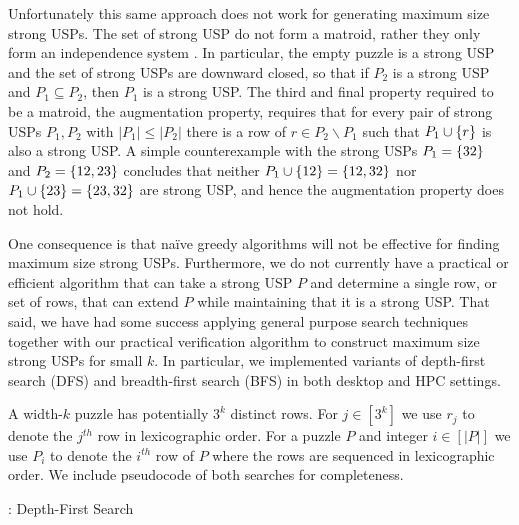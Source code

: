 \documentclass[11pt]{article}
\begin{document}
Unfortunately this same approach does not work for generating maximum
size strong USPs.  The set of strong USP do not form a matroid, rather
they only form an independence system \cite{oxl06}.  In particular,
the empty puzzle is a strong USP and the set of strong USPs are
downward closed, so that if $P_2$ is a strong USP and $P_1 \subseteq
P_2$, then $P_1$ is a strong USP.  The third and final property
required to be a matroid, the augmentation property, requires that for
every pair of strong USPs $P_1, P_2$ with $|P_1| \le |P_2|$ there is a
row of $r \in P_2 \backslash P_1$ such that $P_1 \cup \left\{ r \right\}$ is also
a strong USP.  A simple counterexample with the strong USPs $P_1 =
\left\{ 32 \right\}$ and $P_2 = \left\{ 12, 23 \right\}$ concludes that neither $P_1 \cup
\left\{ 12 \right\} = \left\{ 12, 32 \right\}$ nor $P_1 \cup \left\{ 23 \right\} = \left\{ 23, 32 \right\}$ are
strong USP, and hence the augmentation property does not hold.

One consequence is that na\"{i}ve greedy algorithms will not be
effective for finding maximum size strong USPs.  Furthermore, we do
not currently have a practical or efficient algorithm that can take a
strong USP $P$ and determine a single row, or set of rows, that can
extend $P$ while maintaining that it is a strong USP. That said, we
have had some success applying general purpose search techniques
together with our practical verification algorithm to construct
maximum size strong USPs for small $k$.  In particular, we implemented
variants of depth-first search (DFS) and breadth-first search (BFS) in
both desktop and HPC settings.

A width-$k$ puzzle has potentially $3^k$ distinct rows.  For $j \in
[3^k]$ we use $r_j$ to denote the $j^{th}$ row in lexicographic order.
For a puzzle $P$ and integer $i \in [|P|]$ we use $P_i$ to denote the
$i^{th}$ row of $P$ where the rows are sequenced in lexicographic
order. We include pseudocode of both searches for completeness.

\begin{algorithm}
  \caption{: Depth-First Search}
  \label{alg:dfs}
\begin{algorithmic}[1]



    \EndIf
  \EndFor


  \EndFunction
\end{algorithmic}
\end{algorithm}
\end{document}
